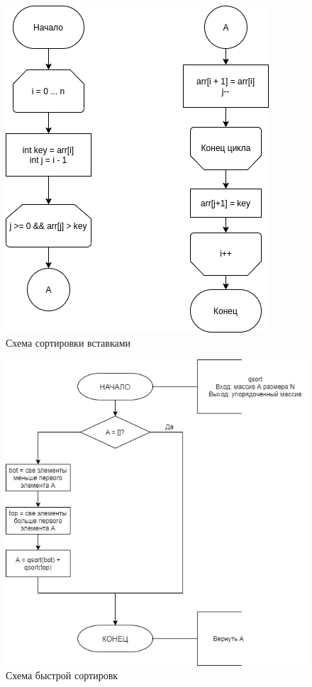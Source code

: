 \documentclass[12pt]{report}
\begin{document}
\begin{figure}[h]
	\centering
	\includegraphics[scale=1]{isort.jpg}
	\caption{Схема сортировки вставками}
	\label{fig:mpr}
\end{figure}

\newpage

\begin{figure}[h]
	\centering
	\includegraphics[scale=0.8]{qsort.jpg}
	\caption{Схема быстрой сортировк}
	\label{fig:mpr}
\end{figure}
\end{document}

